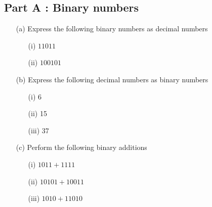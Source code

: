 \documentclass[]{report}
\begin{document}
\begin{enumerate}
\subsection*{Part A :  Binary numbers}
\begin{itemize}
\item[(a)] Express the following binary numbers as decimal numbers
\begin{itemize}
\item[(i)] $11011$
\item[(ii)] $100101$
\end{itemize}
\item[(b)] Express the following decimal numbers as binary numbers
\begin{itemize}
\item[(i)] 6
\item[(ii)] 15
\item[(iii)] 37
\end{itemize}
\item[(c)] Perform the following binary additions
\begin{itemize}
\item[(i)] $1011+ 1111$
\item[(ii)] $10101  + 10011$
\item[(iii)] $1010 + 11010$
\end{itemize}

\end{itemize}



\end{enumerate}
\end{document}
